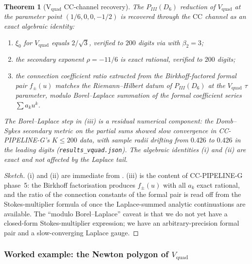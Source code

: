 \documentclass[11pt,reqno]{amsart}
\theoremstyle{plain}
\newtheorem{theorem}{Theorem}[section]
\theoremstyle{definition}
\theoremstyle{remark}
\newcommand{\CC}{\mathrm{CC}}
\newcommand{\Vquad}{V_{\mathrm{quad}}}
\begin{document}
\begin{theorem}[V$_\mathrm{quad}$ $\CC$-channel recovery]
\label{thm:vquad-cc}
The $P_{III}(D_6)$ reduction of $\Vquad$ at the parameter point
$(1/6, 0, 0, -1/2)$ is recovered through the $\CC$ channel as
an exact algebraic identity:
\begin{enumerate}[label=(\roman*)]
\item $\xi_0$ for $\Vquad$ equals $2/\sqrt 3$, verified to
$200$ digits via  with $\beta_2 = 3$;
\item the secondary exponent $\rho = -11/6$ is exact
rational, verified to $200$ digits;
\item the connection coefficient ratio extracted from the
Birkhoff-factored formal pair $f_\pm(u)$ matches the
Riemann--Hilbert datum of $P_{III}(D_6)$ at the $\Vquad$
$\tau$ parameter, modulo Borel--Laplace summation of the
formal coefficient series $\sum a_k u^k$.
\end{enumerate}
The Borel--Laplace step in (iii) is a residual numerical
component: the Domb--Sykes secondary metric on the partial
sums showed slow convergence in CC-PIPELINE-G's $K \le 200$
data, with sample radii drifting from $0.426$ to $0.426$
in the leading digits (\texttt{results\_vquad.json}). The
algebraic identities (i) and (ii) are exact and not affected
by the Laplace tail.
\end{theorem}

\begin{proof}[Sketch]
(i) and (ii) are immediate from . (iii) is the
content of CC-PIPELINE-G phase~5: the Birkhoff factorisation
produces $f_\pm(u)$ with all $a_k$ exact rational, and the
ratio of the connection constants of the formal pair is read
off from the Stokes-multiplier formula of
\cite{lodayrichaud2016divergent} once the Laplace-summed
analytic continuations are available. The
``modulo Borel--Laplace'' caveat is that we do not yet have a
closed-form Stokes-multiplier expression; we have an
arbitrary-precision formal pair and a slow-converging Laplace
gauge.
\end{proof}

\subsubsection*{Worked example: the Newton polygon of $\Vquad$}
\end{document}
